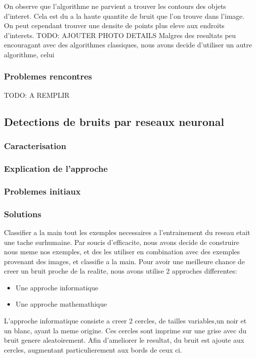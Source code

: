 \documentclass[a4paper, 12pt, titlepage, oneside]{article}
\begin{document}
	On observe que l'algorithme ne parvient a trouver les contours des objets d'interet. Cela est du a la haute quantite de bruit que l'on trouve dans l'image. On 
	peut cependant trouver une densite de points plus eleve aux endroits d'interets.
	TODO: AJOUTER PHOTO DETAILS 
	Malgres des resultats peu encouragant avec des algorithmes classiques, nous avons decide d'utiliser un autre algorithme, celui
	\subsubsection{Problemes rencontres}
	TODO: A REMPLIR
	
	\subsection{Detections de bruits par reseaux neuronal}
	\subsubsection{Caracterisation}
	\subsubsection{Explication de l'approche}
	\subsubsection{Problemes initiaux}
	\subsubsection{Solutions}
	Classifier a la main tout les exemples necessaires a l'entrainement du reseau etait une tache surhumaine. Par soucis d'efficacite, nous avons decide de construire nous meme
	nos exemples, et des les utiliser en combination avec des exemples provenant des images, et classifie a la main.
	Pour avoir une meilleure chance de creer un bruit proche de la realite, nous avons utilise 2 approches differentes:
	\begin{itemize}
		\item Une approche informatique
		\item Une approche mathemathique
	\end{itemize}
	L'approche informatique consiste a creer 2 cercles, de tailles variables,un noir et un blanc, ayant la meme origine. Ces cercles sont imprime sur une  grise
	avec du bruit genere aleatoirement. Afin d'ameliorer le resultat, du bruit est ajoute aux cercles, augmentant particulierement aux bords de ceux ci.
	
\end{document}
